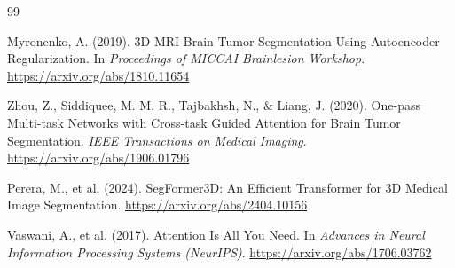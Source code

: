 \begin{thebibliography}{99}

Myronenko, A. (2019).
3D MRI Brain Tumor Segmentation Using Autoencoder Regularization.
In \textit{Proceedings of MICCAI Brainlesion Workshop}.
\url{https://arxiv.org/abs/1810.11654}

Zhou, Z., Siddiquee, M. M. R., Tajbakhsh, N., \& Liang, J. (2020).
One-pass Multi-task Networks with Cross-task Guided Attention for Brain Tumor Segmentation.
\textit{IEEE Transactions on Medical Imaging}.
\url{https://arxiv.org/abs/1906.01796}

Perera, M., et al. (2024).
SegFormer3D: An Efficient Transformer for 3D Medical Image Segmentation.
\url{https://arxiv.org/abs/2404.10156}


Vaswani, A., et al. (2017).
Attention Is All You Need.
In \textit{Advances in Neural Information Processing Systems (NeurIPS)}.
\url{https://arxiv.org/abs/1706.03762}

\end{thebibliography}
